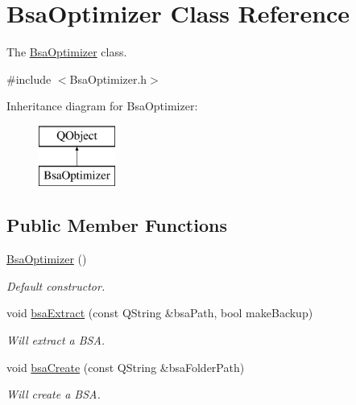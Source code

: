 \hypertarget{class_bsa_optimizer}{}\section{Bsa\+Optimizer Class Reference}
\label{class_bsa_optimizer}


The \mbox{\hyperlink{class_bsa_optimizer}{Bsa\+Optimizer}} class.  




{\ttfamily \#include $<$Bsa\+Optimizer.\+h$>$}

Inheritance diagram for Bsa\+Optimizer\+:\begin{figure}[H]
\begin{center}
\leavevmode
\includegraphics[height=2.000000cm]{class_bsa_optimizer}
\end{center}
\end{figure}
\subsection*{Public Member Functions}
\begin{DoxyCompactItemize}
\item 
\mbox{\label{class_bsa_optimizer_aa97141413655b2d44133e8498774681b}} 
\mbox{\hyperlink{class_bsa_optimizer_aa97141413655b2d44133e8498774681b}{Bsa\+Optimizer}} ()
\begin{DoxyCompactList}\small\item\em Default constructor. \end{DoxyCompactList}\item 
void \mbox{\hyperlink{class_bsa_optimizer_a253e4302919422633f6a445306280528}{bsa\+Extract}} (const Q\+String \&bsa\+Path, bool make\+Backup)
\begin{DoxyCompactList}\small\item\em Will extract a B\+SA. \end{DoxyCompactList}\item 
void \mbox{\hyperlink{class_bsa_optimizer_a4a89802c827b3f044a97287efaac6ef8}{bsa\+Create}} (const Q\+String \&bsa\+Folder\+Path)
\begin{DoxyCompactList}\small\item\em Will create a B\+SA. \end{DoxyCompactList}\end{DoxyCompactItemize}


